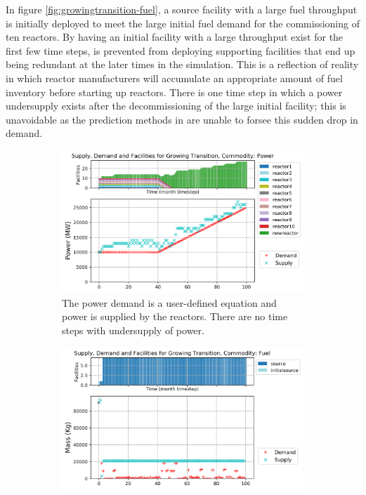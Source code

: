 In figure \ref{fig:growingtransition-fuel},
a source facility with a large fuel throughput is initially
deployed to meet the large initial fuel demand for the commissioning 
of ten reactors. 
By having an initial facility with a large throughput exist for the 
first few time steps, 
\deploy is prevented from deploying supporting
facilities that end up being redundant at the later times in  
the simulation.
This is a reflection of reality in which reactor manufacturers will 
accumulate an appropriate amount of fuel inventory before starting 
up reactors. 
There is one time step in which a power undersupply exists after the 
decommissioning of the large initial facility; 
this is unavoidable as the prediction methods in \deploy are 
unable to forsee this sudden drop in demand. 

\begin{figure}[]
    \centering
    \begin{subfigure}[t]{0.8\textwidth}
    \centering
        \includegraphics[width=0.9\linewidth]{figures/growingtransition-power.png} 
        \caption{The power demand is a user-defined equation and power is supplied by the reactors.
        There are no time steps with undersupply of power.}
        \label{fig:growingtransition-power}
    \end{subfigure}
    \begin{subfigure}[t]{0.6\textwidth}
        \centering
        \includegraphics[width=\linewidth]{figures/growingtransition-fuel.png} 

\end{subfigure}
\end{figure}
